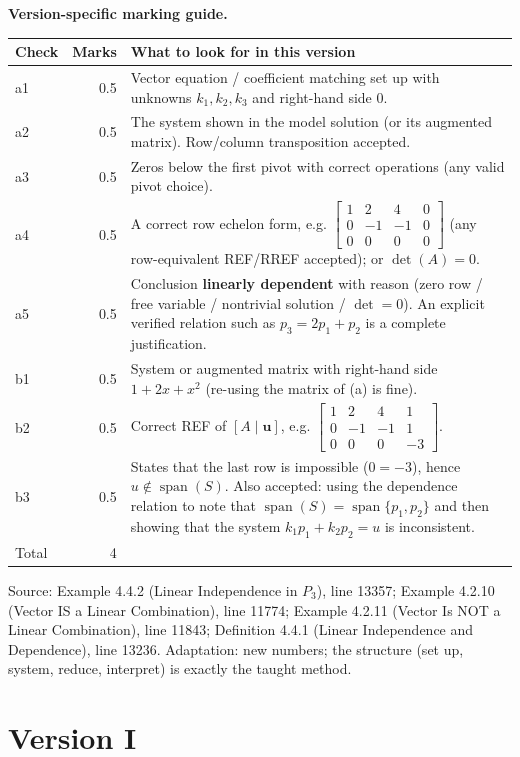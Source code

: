 \documentclass[11pt,a4paper]{article}
\newcommand{\Src}[1]{{\footnotesize\color{black!65}Source: #1}}
\begin{document}
\textbf{Version-specific marking guide.}\par
\begin{tabularx}{\linewidth}{@{}l r >{\raggedright\arraybackslash}X@{}}\toprule Check & Marks & What to look for in this version\\\midrule
a1 & 0.5 & Vector equation / coefficient matching set up with unknowns $k_1,k_2,k_3$ and right-hand side $0$.\\
a2 & 0.5 & The system shown in the model solution (or its augmented matrix). Row/column transposition accepted.\\
a3 & 0.5 & Zeros below the first pivot with correct operations (any valid pivot choice).\\
a4 & 0.5 & A correct row echelon form, e.g. $\left[\begin{array}{ccc|c} 1 & 2 & 4 & 0 \\ 0 & -1 & -1 & 0 \\ 0 & 0 & 0 & 0 \end{array}\right]$ (any row-equivalent REF/RREF accepted); or $\det(A)=0$.\\
a5 & 0.5 & Conclusion \textbf{linearly dependent} with reason (zero row / free variable / nontrivial solution / $\det=0$). An explicit verified relation such as $p_3=2p_1+p_2$ is a complete justification.\\
b1 & 0.5 & System or augmented matrix with right-hand side $1+2x+x^{2}$ (re-using the matrix of (a) is fine).\\
b2 & 0.5 & Correct REF of $[A\mid\mathbf{u}]$, e.g. $\left[\begin{array}{ccc|c} 1 & 2 & 4 & 1 \\ 0 & -1 & -1 & 1 \\ 0 & 0 & 0 & -3 \end{array}\right]$.\\
b3 & 0.5 & States that the last row is impossible ($0=-3$), hence $u\notin\operatorname{span}(S)$. Also accepted: using the dependence relation to note that $\operatorname{span}(S)=\operatorname{span}\{p_1,p_2\}$ and then showing that the system $k_1p_1+k_2p_2=u$ is inconsistent.\\
\midrule Total & 4 & \\\bottomrule\end{tabularx}
\Src{Example 4.4.2 (Linear Independence in $P_3$), line 13357; Example 4.2.10 (Vector IS a Linear Combination), line 11774; Example 4.2.11 (Vector Is NOT a Linear Combination), line 11843; Definition 4.4.1 (Linear Independence and Dependence), line 13236. Adaptation: new numbers; the structure (set up, system, reduce, interpret) is exactly the taught method.}\par
\clearpage\section*{Version I}
\end{document}
